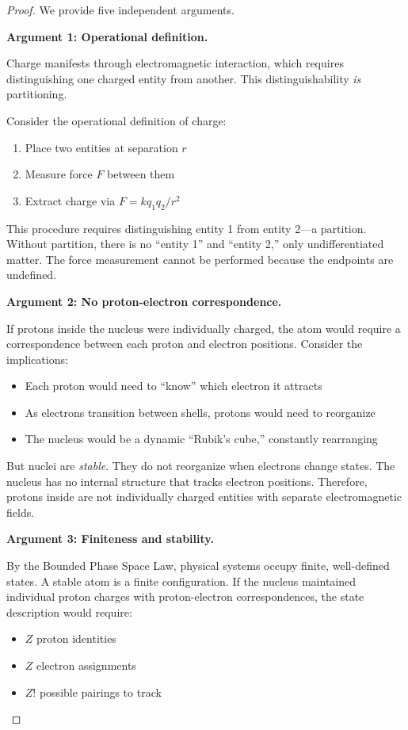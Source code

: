 \documentclass[twocolumn,10pt,a4paper]{article}
\theoremstyle{definition}
\theoremstyle{remark}
\begin{document}
\begin{proof}
We provide five independent arguments.

\textbf{Argument 1: Operational definition.}

Charge manifests through electromagnetic interaction, which requires distinguishing one charged entity from another. This distinguishability \emph{is} partitioning.

Consider the operational definition of charge:
\begin{enumerate}
    \item Place two entities at separation $r$
    \item Measure force $F$ between them
    \item Extract charge via $F = kq_1q_2/r^2$
\end{enumerate}

This procedure requires distinguishing entity 1 from entity 2---a partition. Without partition, there is no ``entity 1'' and ``entity 2,'' only undifferentiated matter. The force measurement cannot be performed because the endpoints are undefined.

\textbf{Argument 2: No proton-electron correspondence.}

If protons inside the nucleus were individually charged, the atom would require a correspondence between each proton and electron positions. Consider the implications:
\begin{itemize}
    \item Each proton would need to ``know'' which electron it attracts
    \item As electrons transition between shells, protons would need to reorganize
    \item The nucleus would be a dynamic ``Rubik's cube,'' constantly rearranging
\end{itemize}

But nuclei are \emph{stable}. They do not reorganize when electrons change states. The nucleus has no internal structure that tracks electron positions. Therefore, protons inside are not individually charged entities with separate electromagnetic fields.

\textbf{Argument 3: Finiteness and stability.}

By the Bounded Phase Space Law, physical systems occupy finite, well-defined states. A stable atom is a finite configuration. If the nucleus maintained individual proton charges with proton-electron correspondences, the state description would require:
\begin{itemize}
    \item $Z$ proton identities
    \item $Z$ electron assignments
    \item $Z!$ possible pairings to track
\end{itemize}


\end{proof}
\end{document}
